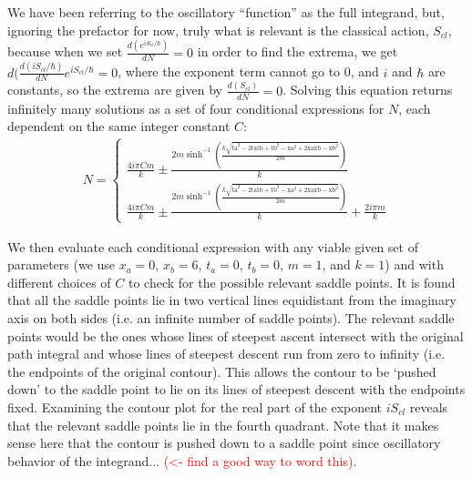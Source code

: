\documentclass[12pt]{revtex4}
\newcommand{\red}{\textcolor{red}}
\begin{document}
We have been referring to the oscillatory ``function'' as the full integrand, but, ignoring the prefactor for now, truly what is relevant is the classical action, $S_{cl}$, because when we set $\frac{d(e^{i S_{cl}/\hbar})}{dN}=0$ in order to find the extrema, we get $d(\frac{d(i S_{cl}/\hbar)}{dN} e^{i S_{cl}/\hbar}=0$, where the exponent term cannot go to 0, and $i$ and $\hbar$ are constants, so the extrema are given by $\frac{d(S_{cl})}{dN}=0$. Solving this equation returns infinitely many solutions as a set of four conditional expressions for $N$, each dependent on the same integer constant $C$:
\begin{align*}
N = \begin{cases}
\frac{4 i \pi  C m}{k} \pm \frac{2 m \sinh ^{-1}\left(\frac{k \sqrt{\text{ta}^2-2 \text{ta} \text{tb}+\text{tb}^2-\text{xa}^2+2 \text{xa} \text{xb}-\text{xb}^2}}{2 m}\right)}{k}\\
\frac{4 i \pi  C m}{k} \pm \frac{2 m \sinh ^{-1}\left(\frac{k \sqrt{\text{ta}^2-2 \text{ta} \text{tb}+\text{tb}^2-\text{xa}^2+2 \text{xa} \text{xb}-\text{xb}^2}}{2 m}\right)}{k}+\frac{2 i \pi  m}{k} 
\end{cases}
\end{align*}

We then evaluate each conditional expression with any viable given set of parameters (we use $x_a=0$, $x_b=6$, $t_a=0$, $t_b=0$, $m=1$, and $k=1$) and with different choices of $C$ to check for the possible relevant saddle points. It is found that all the saddle points lie in two vertical lines equidistant from the imaginary axis on both sides (i.e. an infinite number of saddle points). The relevant saddle points would be the ones whose lines of steepest ascent intersect with the original path integral and whose lines of steepest descent run from zero to infinity (i.e. the endpoints of the original contour). This allows the contour to be `pushed down' to the saddle point to lie on its lines of steepest descent with the endpoints fixed. Examining the contour plot for the real part of the exponent $i S_{cl}$ reveals that the relevant saddle points lie in the fourth quadrant. Note that it makes sense here that the contour is pushed down to a saddle point since oscillatory behavior of the integrand... \red{(<- find a good way to word this)}. 
\end{document}
